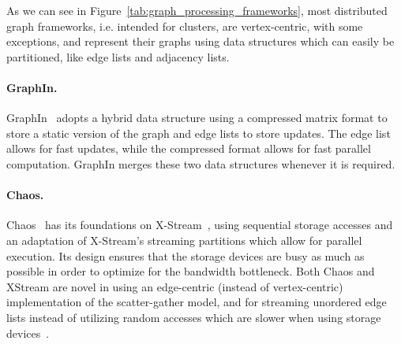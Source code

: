     As we can see in Figure~\ref{tab:graph_processing_frameworks}, most distributed graph frameworks, i.e. intended for clusters, are vertex-centric, with some exceptions, and represent their graphs using data structures which can easily be partitioned, like edge lists and adjacency lists.



    \paragraph{\textbf{GraphIn}.} 
    GraphIn~\cite{paper:graphin} adopts a hybrid data structure using a compressed matrix format to store a static version of the graph and edge lists to store updates. The edge list allows for fast updates, while the compressed format allows for fast parallel computation. GraphIn merges these two data structures whenever it is required.

    \paragraph{\textbf{Chaos}.} 
    Chaos~\cite{paper:chaos} has its foundations on X-Stream~\cite{paper:xstream}, using sequential storage accesses and an adaptation of X-Stream’s streaming partitions which allow for parallel execution. Its design ensures that the storage devices are busy as much as possible in order to optimize for the bandwidth bottleneck. Both Chaos and XStream are novel in using an edge-centric (instead of vertex-centric) implementation of the scatter-gather model, and for streaming unordered edge lists instead of utilizing random accesses which are slower when using storage devices~\cite{survey:graph_processing_landscape}.

